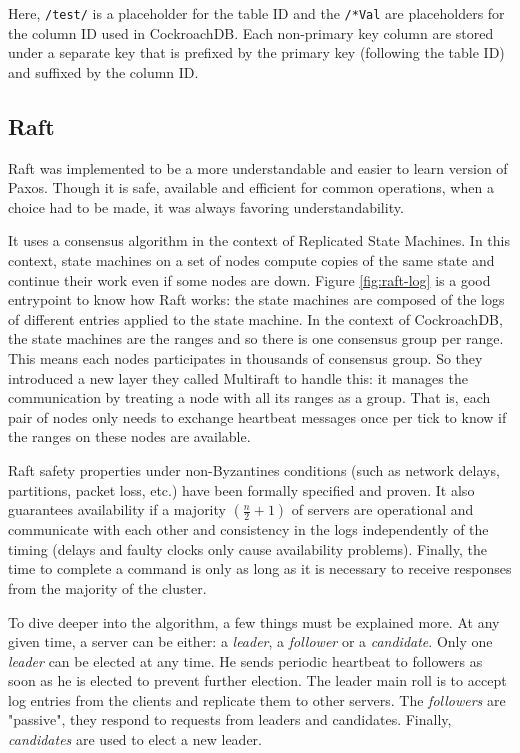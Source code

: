 Here, \verb~/test/~ is a placeholder for the table ID and the \verb~/*Val~ are placeholders for the column ID used in CockroachDB. Each non-primary key column are stored under a separate key that is prefixed by the primary key (following the table ID) and suffixed by the column ID.

\subsection{Raft}



Raft was implemented to be a more understandable and easier to learn version of Paxos\cite{DBLP:conf/usenix/OngaroO14}. Though it is safe, available and efficient for common operations, when a choice had to be made, it was always favoring understandability.


It uses a consensus algorithm in the context of Replicated State Machines. In this context, state machines on a set of nodes compute copies of the same state and continue their work even if some nodes are down. Figure \ref{fig:raft-log} is a good entrypoint to know how Raft works: the state machines are composed of the logs of different entries applied to the state machine.
In the context of CockroachDB, the state machines are the ranges and so there is one consensus group per range. This means each nodes participates in thousands of consensus group. So they introduced a new layer they called Multiraft to handle this: it manages the communication by treating a node with all its ranges as a group. That is, each pair of nodes only needs to exchange heartbeat messages once per tick to know if the ranges on these nodes are available\cite{CRDB:multiraft}.

Raft safety properties under non-Byzantines conditions (such as network delays, partitions, packet loss, etc.) have been formally specified and proven. It also guarantees availability if a majority $(\frac{n}{2} + 1)$ of servers are operational and communicate with each other and consistency in the logs independently of the timing (delays and faulty clocks only cause availability problems). Finally, the time to complete a command is only as long as it is necessary to receive responses from the majority of the cluster.

To dive deeper into the algorithm, a few things must be explained more. At any given time, a server can be either: a \emph{leader}, a \emph{follower} or a \emph{candidate}. Only one \emph{leader} can be elected at any time. He sends periodic heartbeat to followers as soon as he is elected to prevent further election. The leader main roll is to accept log entries from the clients and replicate them to other servers. The \emph{followers} are "passive", they respond to requests from leaders and candidates. Finally, \emph{candidates} are used to elect a new leader.

